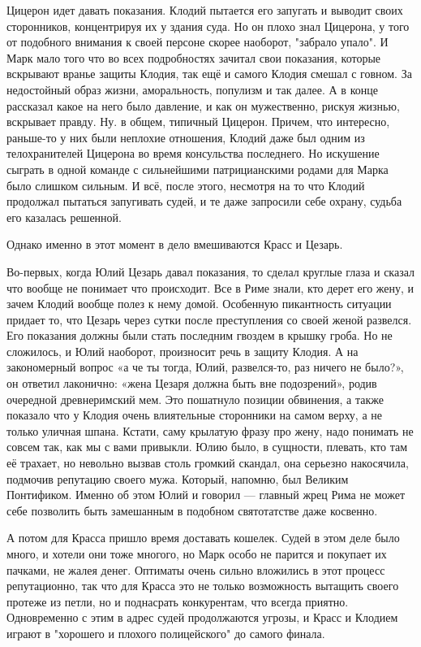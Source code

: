 Цицерон идет давать показания. Клодий пытается его запугать и выводит своих сторонников, концентрируя их у здания суда. Но он плохо знал Цицерона, у того от подобного внимания к своей персоне скорее наоборот, "забрало упало". И Марк мало того что во всех подробностях зачитал свои показания, которые вскрывают вранье защиты Клодия, так ещё и самого Клодия смешал с говном. За недостойный образ жизни, аморальность, популизм и так далее. А в конце рассказал какое на него было давление, и как он мужественно, рискуя жизнью, вскрывает правду. Ну. в общем, типичный Цицерон. Причем, что интересно, раньше-то у них были неплохие отношения, Клодий даже был одним из телохранителей Цицерона во время консульства последнего. Но искушение сыграть в одной команде с сильнейшими патрицианскими родами для Марка было слишком сильным. И всё, после этого, несмотря на то что Клодий продолжал пытаться запугивать судей, и те даже запросили себе охрану, судьба его казалась решенной.

Однако именно в этот момент в дело вмешиваются Красс и Цезарь.


Во-первых, когда Юлий Цезарь давал показания, то сделал круглые глаза и сказал что вообще не понимает что происходит. Все в Риме знали, кто дерет его жену, и зачем Клодий вообще полез к нему домой. Особенную пикантность ситуации придает то, что Цезарь через сутки после преступления со своей женой развелся. Его показания должны были стать последним гвоздем в крышку гроба. Но не сложилось, и Юлий наоборот, произносит речь в защиту Клодия. А на закономерный вопрос «а че ты тогда, Юлий, развелся-то, раз ничего не было?», он ответил лаконично: «жена Цезаря должна быть вне подозрений», родив очередной древнеримский мем. Это пошатнуло позиции обвинения, а также показало что у Клодия очень влиятельные сторонники на самом верху, а не только уличная шпана. Кстати, саму крылатую фразу про жену, надо понимать не совсем так, как мы с вами привыкли. Юлию было, в сущности, плевать, кто там её трахает, но невольно вызвав столь громкий скандал, она серьезно накосячила, подмочив репутацию своего мужа. Который, напомню, был Великим Понтификом. Именно об этом Юлий и говорил — главный жрец Рима не может себе позволить быть замешанным в подобном святотатстве даже косвенно.


А потом для Красса пришло время доставать кошелек. Судей в этом деле было много, и хотели они тоже многого, но Марк особо не парится и покупает их пачками, не жалея денег. Оптиматы очень сильно вложились в этот процесс репутационно, так что для Красса это не только возможность вытащить своего протеже из петли, но и поднасрать конкурентам, что всегда приятно. Одновременно с этим в адрес судей продолжаются угрозы, и Красс и Клодием играют в "хорошего и плохого полицейского" до самого финала.


